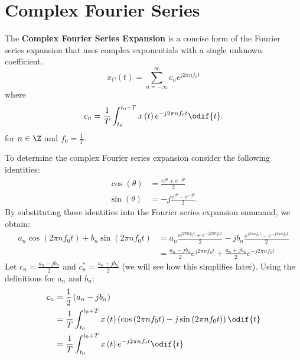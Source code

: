 \documentclass{article}
\begin{document}
\section{Complex Fourier Series}
\begin{definition}
    The \textbf{Complex Fourier Series Expansion} is a concise form of the Fourier series expansion that uses complex exponentials with a single unknown coefficient.
    \begin{equation*}
        x_C\left( t \right) = \sum_{n = -\infty}^\infty c_n e^{j 2\pi n f_0 t}
    \end{equation*}
    where
    \begin{equation*}
        c_n = \frac{1}{T} \int_{t_0}^{t_0 + T} x\left( t \right) e^{-j 2\pi n f_0 t} \odif{t}.
    \end{equation*}
    for \(n \in \Z\) and \(f_0 = \frac{1}{T}\).
\end{definition}
To determine the complex Fourier series expansion consider the following identities:
\begin{align*}
    \cos{\left( \theta \right)} & = \frac{e^{j \theta} + e^{-j \theta}}{2}     \\
    \sin{\left( \theta \right)} & = -j \frac{e^{j \theta} - e^{-j \theta}}{2}.
\end{align*}
By substituting these identities into the Fourier series expansion summand, we obtain:
\begin{align*}
    a_n \cos{\left( 2\pi n f_0 t \right)} + b_n \sin{\left( 2\pi n f_0 t \right)} & = a_n \frac{e^{j 2\pi n f_0 t} + e^{-j 2\pi n f_0 t}}{2} -j b_n \frac{e^{j 2\pi n f_0 t} - e^{-j 2\pi n f_0 t}}{2} \\
                                                                                  & = \frac{a_n - j b_n}{2} e^{j 2\pi n f_0 t} + \frac{a_n + j b_n}{2} e^{-j 2\pi n f_0 t}
\end{align*}
Let \(c_n = \frac{a_n - j b_n}{2}\) and \(c_n^\ast = \frac{a_n + j b_n}{2}\) (we will see how this simplifies later).
Using the definitions for \(a_n\) and \(b_n\):
\begin{align*}
    c_n & = \frac{1}{2} \left( a_n - j b_n \right)                                                                                                            \\
        & = \frac{1}{T} \int_{t_0}^{t_0 + T} x\left( t \right) \left( \cos{\left( 2\pi n f_0 t \right)} -j \sin{\left( 2\pi n f_0 t \right)} \right) \odif{t} \\
        & = \frac{1}{T} \int_{t_0}^{t_0 + T} x\left( t \right) e^{-j 2\pi n f_0 t} \odif{t}
\end{align*}
\end{document}
